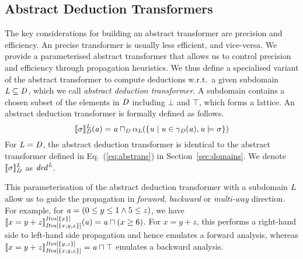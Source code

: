 \subsection{Abstract Deduction Transformers} \label{sec:abst}
The key considerations for building an abstract transformer are 
precision and efficiency.  An precise transformer is usually less efficient, 
and vice-versa.  We provide a parameterised abstract transformer that allows us to 
control precision and efficiency through propagation heuristics. 
%
We thus define a specialised variant of the abstract transformer to compute
deductions w.r.t.\ a given subdomain $\subdomain\subseteq \domain$,
which we call \emph{abstract deduction transformer}.
%
A subdomain contains a chosen subset of the elements in $\domain$ including
$\bot$ and $\top$, which forms a lattice.  An abstract 
deduction transformer is formally defined as follows. 
\begin{equation}\label{eq:at2}
\abstrans{\domain}{\constraint}^\subdomain(\absval)=\absval\meet_\domain \alpha_\subdomain(\{\val\mid \val\in\gamma_\domain(\absval), \val\models \constraint\})
\end{equation}
For $\subdomain=\domain$, the abstract deduction transformer is identical 
to the abstract transformer defined in Eq.~(\ref{eq:abstrans})
in Section~\ref{sec:domains}.  We denote $\abstrans{\domain}{\constraint}^\subdomain$
as $\abstransel{\subdomain}$.

%

This parameterisation of the abstract deduction transformer with a subdomain 
$\subdomain$ allow us to guide the propagation in {\em forward}, {\em backward} 
or {\em multi-way} direction.
%
For example, for $\absval=(0\leq y \leq 1 \wedge 5\leq z)$, we have
$\abstrans{\intervals[\{x,y,z\}]}{x=y+z}^{\intervals[\{x\}]}(\absval)=\absval\meet(x\geq
6)$. For $x=y+z$, this performs a right-hand side to left-hand side propagation and
hence emulates a forward analysis, whereas
$\abstrans{\intervals[\{x,y,z\}]}{x=y+z}^{\intervals[\{y,z\}]}=\absval\meet\top$
emulates a backward analysis.

